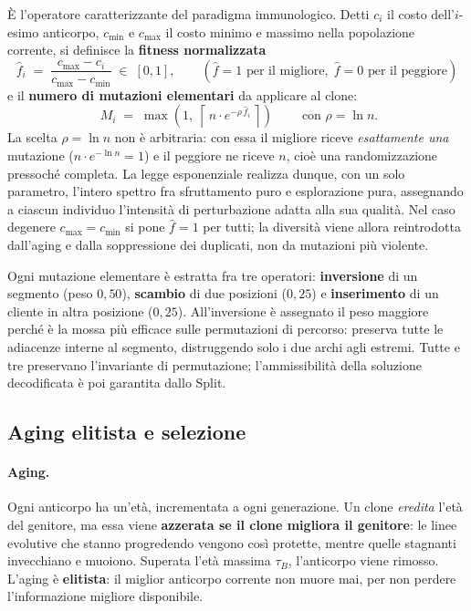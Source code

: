 \documentclass[10pt,a4paper]{article}
\begin{document}
È l'operatore caratterizzante del paradigma immunologico. Detti $c_i$ il costo
dell'$i$-esimo anticorpo, $c_{\min}$ e $c_{\max}$ il costo minimo e massimo nella
popolazione corrente, si definisce la \textbf{fitness normalizzata}
\[
  \hat{f}_i \;=\; \frac{c_{\max}-c_i}{c_{\max}-c_{\min}} \;\in\; [0,1],
  \qquad (\hat{f}=1 \text{ per il migliore},\; \hat{f}=0 \text{ per il peggiore})
\]
e il \textbf{numero di mutazioni elementari} da applicare al clone:
\[
  \boxed{\;M_i \;=\; \max\!\left(1,\; \left\lceil\, n \cdot e^{-\rho\,\hat{f}_i} \,\right\rceil\right)\;}
  \qquad\text{con } \rho = \ln n .
\]
La scelta $\rho=\ln n$ non è arbitraria: con essa il migliore riceve
\emph{esattamente una} mutazione ($n \cdot e^{-\ln n} = 1$) e il peggiore ne
riceve $n$, cioè una randomizzazione pressoché completa. La legge esponenziale
realizza dunque, con un solo parametro, l'intero spettro fra sfruttamento puro e
esplorazione pura, assegnando a ciascun individuo l'intensità di perturbazione
adatta alla sua qualità. Nel caso degenere $c_{\max}=c_{\min}$ si pone
$\hat{f}=1$ per tutti; la diversità viene allora reintrodotta dall'aging e dalla
soppressione dei duplicati, non da mutazioni più violente.

Ogni mutazione elementare è estratta fra tre operatori: \textbf{inversione} di un
segmento (peso $0{,}50$), \textbf{scambio} di due posizioni ($0{,}25$) e
\textbf{inserimento} di un cliente in altra posizione ($0{,}25$). All'inversione è
assegnato il peso maggiore perché è la mossa più efficace sulle permutazioni di
percorso: preserva tutte le adiacenze interne al segmento, distruggendo solo i due
archi agli estremi. Tutte e tre preservano l'invariante di permutazione;
l'ammissibilità della soluzione decodificata è poi garantita dallo Split.

\subsection{Aging elitista e selezione}

\paragraph{Aging.} Ogni anticorpo ha un'età, incrementata a ogni generazione. Un
clone \emph{eredita} l'età del genitore, ma essa viene \textbf{azzerata se il
clone migliora il genitore}: le linee evolutive che stanno progredendo vengono
così protette, mentre quelle stagnanti invecchiano e muoiono. Superata l'età
massima $\tau_B$, l'anticorpo viene rimosso. L'aging è \textbf{elitista}: il
miglior anticorpo corrente non muore mai, per non perdere l'informazione
migliore disponibile.
\end{document}
